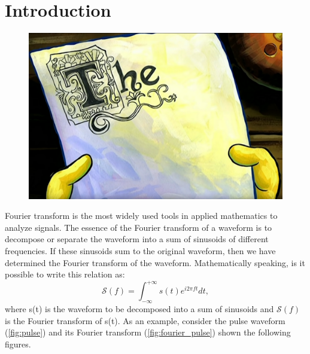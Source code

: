 \documentclass[a4paper,12pt]{article}
\begin{document}
\section*{Introduction}


\begin{figure} %
    \vspace{-15pt}
    \includegraphics[width=\linewidth]{THE.png}
    \vspace{-48pt}
\end{figure}
 Fourier transform is the most widely used tools in applied mathematics
to analyze signals. The essence of the Fourier transform of a waveform is to decompose
or separate the waveform into a sum of sinusoids of different frequencies.
If these sinusoids sum to the original waveform, then we have determined
the Fourier transform of the waveform.
Mathematically speaking, is it possible to write this relation as:
$$
\mathcal{S}(f) = \int_{-\infty}^{+\infty} s(t) e^{i2\pi f t} dt,
$$
where s(t) is the waveform to be decomposed into a sum of sinusoids
and $\mathcal{S}(f)$ is the Fourier transform of s(t).
As an example, consider the
pulse waveform (\ref{fig:pulse}) and its Fourier transform (\ref{fig:fourier_pulse}) shown the following figures.
\end{document}
